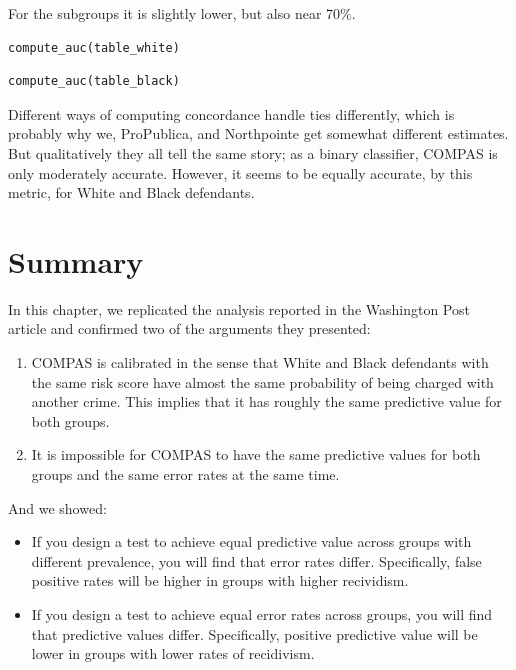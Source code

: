 For the subgroups it is slightly lower, but also near 70\%.

\begin{lstlisting}[language=Python,style=source]
compute_auc(table_white)
\end{lstlisting}

\begin{lstlisting}[language=Python,style=source]
compute_auc(table_black)
\end{lstlisting}

Different ways of computing concordance handle ties differently, which
is probably why we, ProPublica, and Northpointe get somewhat different
estimates. But qualitatively they all tell the same story; as a binary
classifier, COMPAS is only moderately accurate. However, it seems to be
equally accurate, by this metric, for White and Black defendants.

\hypertarget{summary}{%
\section{Summary}\label{summary}}

In this chapter, we replicated the analysis reported in the Washington
Post article and confirmed two of the arguments they presented:

\begin{enumerate}
\def\labelenumi{\arabic{enumi}.}
\item
  COMPAS is calibrated in the sense that White and Black defendants with
  the same risk score have almost the same probability of being charged
  with another crime. This implies that it has roughly the same
  predictive value for both groups.
\item
  It is impossible for COMPAS to have the same predictive values for
  both groups and the same error rates at the same time.
\end{enumerate}

And we showed:

\begin{itemize}
\item
  If you design a test to achieve equal predictive value across groups
  with different prevalence, you will find that error rates differ.
  Specifically, false positive rates will be higher in groups with
  higher recividism.
\item
  If you design a test to achieve equal error rates across groups, you
  will find that predictive values differ. Specifically, positive
  predictive value will be lower in groups with lower rates of
  recidivism.
\end{itemize}


